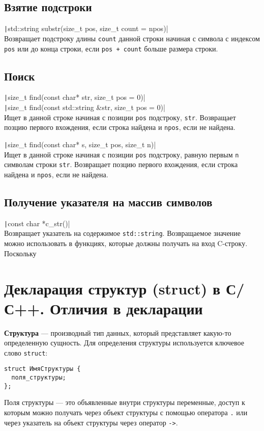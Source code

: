 \subsection{Взятие подстроки}
\texttt|std::string substr(size_t pos, size_t count = npos)|\\
Возвращает подстроку длины \verb|count| данной строки начиная с символа с индексом \verb|pos| или до конца строки,
если \verb|pos + count| больше размера строки.

\subsection{Поиск}
\vspace{0.6cm}
\noindent
\texttt|size_t find(const char* str, size_t pos = 0)|\\
\texttt|size_t find(const std::string &str, size_t pos = 0)|\\
Ищет в данной строке начиная с позиции \verb|pos| подстроку, \verb|str|.
Возвращает позцию первого вхождения, если строка найдена и \verb|npos|, если не найдена.

\vspace{0.6cm}
\noindent
\texttt|size_t find(const char* s, size_t pos, size_t n)|\\
Ищет в данной строке начиная с позиции \verb|pos| подстроку, равную первым \verb|n| символам строки \verb|str|.
Возвращает позцию первого вхождения, если строка найдена и \verb|npos|, если не найдена.

\subsection{Получение указателя на массив символов}
\texttt|const char *c_str()|\\
Возвращает указатель на содержимое \verb|std::string|. Возвращаемое значение можно использовать в функциях,
которые должны получать на вход C-строку. Поскольку 

\section{Декларация структур (struct) в С/С++. Отличия в декларации}
\textbf{Структура} \label{def:struct} --- производный тип данных, который представляет какую-то определенную сущность.
Для определения структуры используется ключевое слово \verb|struct|:
\begin{verbatim}
struct ИмяСтруктуры {
  поля_структуры;
};
\end{verbatim}
Поля структуры --- это объявленные внутри структуры переменные, доступ к которым можно получать через объект структуры
с помощью оператора \verb|.| или через указатель на объект структуры через оператор \verb|->|.


